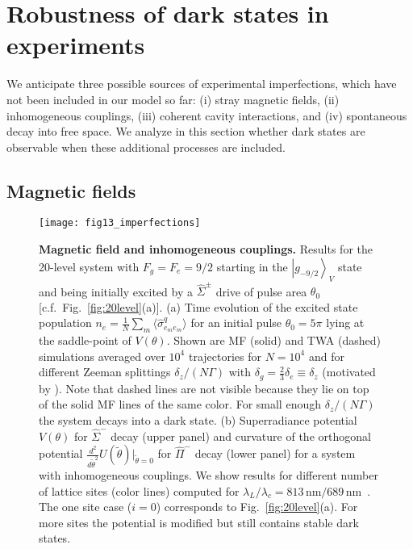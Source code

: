 \documentclass[aps,prx,superscriptaddress,twocolumn,notitlepage,nofootinbib,longbibliography]{revtex4-2}
\newcommand{\ket}[1]{\left|#1\right>}
\newcommand{\qusub}{q}
\begin{document}

\section{Robustness of dark states in experiments\label{sec:robustness}}

We anticipate three possible sources of experimental imperfections, which have not been included in our model so far: (i) stray magnetic fields, (ii) inhomogeneous couplings, (iii) coherent cavity interactions, and (iv) spontaneous decay into free space.
We analyze in this section whether dark states are observable when these additional processes are included.



\subsection{Magnetic fields}

\begin{figure}[t]
\centering
\texttt{[image: fig13\_imperfections]}
\caption{\textbf{Magnetic field and inhomogeneous couplings.} Results for the 20-level system with $F_g=F_e=9/2$ starting in the $\ket{g_{-9/2}}_V$ state and being initially excited by a $\hat{\Sigma}^\pm$ drive of pulse area $\theta_0$ [c.f.~Fig.~\ref{fig:20level}(a)]. (a) Time evolution of the excited state population $n_e = \frac{1}{N} \sum_m \langle \hat{\sigma}^{\qusub}_{e_me_m}\rangle$ for an initial pulse $\theta_0=5\pi$ lying at the saddle-point of $V(\theta)$. Shown are MF (solid) and TWA (dashed) simulations averaged over $10^4$ trajectories for $N=10^4$ and for different Zeeman splittings $\delta_z/(N\Gamma)$ with $\delta_g=\frac{2}{3}\delta_e\equiv \delta_z$ (motivated by \cite{BoydYe_PRA2007}). Note that dashed lines are not visible because they lie on top of the solid MF lines of the same color. For small enough $\delta_z/(N\Gamma)$ the system decays into a dark state. (b) Superradiance potential $V(\theta)$ for $\hat{\Sigma}^-$ decay (upper panel) and curvature of the orthogonal potential $\frac{d^2}{d\tilde{\theta}^2}U(\tilde\theta)\big|_{\tilde\theta=0}$ for $\hat{\Pi}^-$ decay (lower panel) for a system with inhomogeneous couplings. We show results for different number of lattice sites (color lines) computed for $\lambda_L/\lambda_c=813\,\text{nm}/689\,\text{nm}$~\cite{ThompsonMuniz_Arxiv2019}. The one site case ($i=0$) corresponds to Fig.~\ref{fig:20level}(a). For more sites the potential is modified but still contains stable dark states. }
\label{fig:imperfections}
\end{figure}
\end{document}
